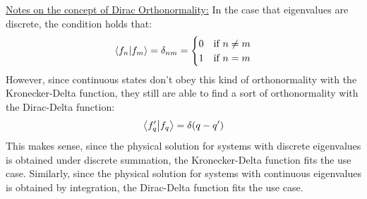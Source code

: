 \documentclass{article}
\newcommand{\sheader}[1]{\underline{#1:}}
\begin{document}
    \sheader{Notes on the concept of Dirac Orthonormality} In the case that eigenvalues are 
    discrete, the condition holds that:
    \begin{align*}
        \braket{f_n}{f_m} = \delta_{nm} = \begin{cases}
            0 & \textrm{if  } n \neq m\\
            1 & \textrm{if  } n = m
        \end{cases}
    \end{align*}
    However, since continuous states don't obey this kind of orthonormality with the Kronecker-Delta 
    function, they still are able to find a sort of orthonormality with the Dirac-Delta function:
    \begin{align*}
        \braket{f_q'}{f_q} = \delta(q - q')
    \end{align*}
    This makes sense, since the physical solution for systems with discrete eigenvalues is obtained under discrete summation,
    the Kronecker-Delta function fits the use case. Similarly, since the physical solution for 
    systems with continuous eigenvalues is obtained by integration, the Dirac-Delta function fits the use case.
\end{document}
